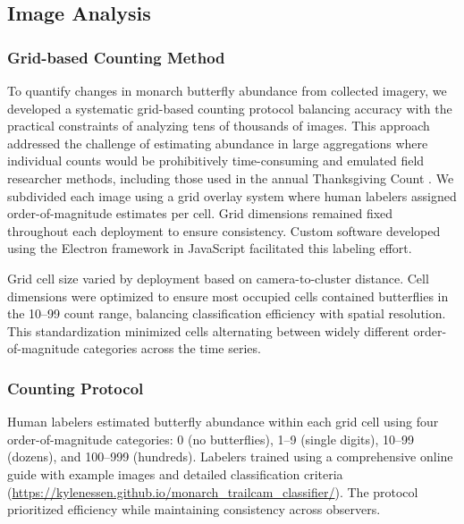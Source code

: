 
\subsection{Image Analysis}

\subsubsection{Grid-based Counting Method}

To quantify changes in monarch butterfly abundance from collected imagery, we developed a systematic grid-based counting protocol balancing accuracy with the practical constraints of analyzing tens of thousands of images. This approach addressed the challenge of estimating abundance in large aggregations where individual counts would be prohibitively time-consuming and emulated field researcher methods, including those used in the annual Thanksgiving Count \autocite{xercesProtocolsWesternMonarch2017}. We subdivided each image using a grid overlay system where human labelers assigned order-of-magnitude estimates per cell. Grid dimensions remained fixed throughout each deployment to ensure consistency. Custom software developed using the Electron framework in JavaScript facilitated this labeling effort.

Grid cell size varied by deployment based on camera-to-cluster distance. Cell dimensions were optimized to ensure most occupied cells contained butterflies in the 10–99 count range, balancing classification efficiency with spatial resolution. This standardization minimized cells alternating between widely different order-of-magnitude categories across the time series.

\subsubsection{Counting Protocol}

Human labelers estimated butterfly abundance within each grid cell using four order-of-magnitude categories: 0 (no butterflies), 1–9 (single digits), 10–99 (dozens), and 100–999 (hundreds). Labelers trained using a comprehensive online guide with example images and detailed classification criteria (\url{https://kylenessen.github.io/monarch_trailcam_classifier/}). The protocol prioritized efficiency while maintaining consistency across observers.

